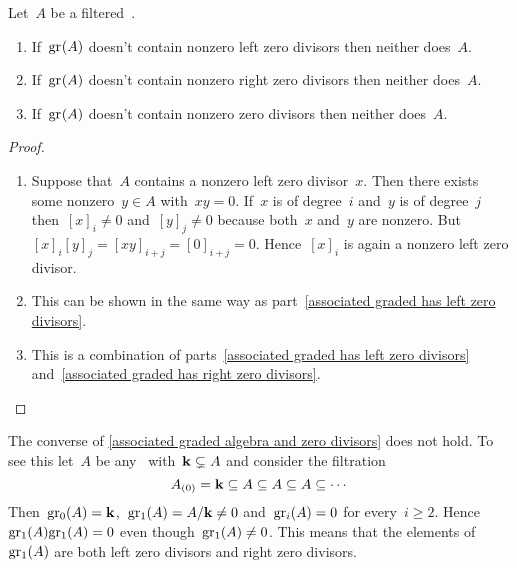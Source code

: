 \begin{proposition}
  \label{associated graded algebra and zero divisors}
  Let~$A$ be a filtered~{\algebra{$\kf$}}.
  \begin{enumerate}
    \item
      \label{associated graded has left zero divisors}
      If~$\gr(A)$ doesn’t contain nonzero left zero divisors then neither does~$A$.
    \item
      \label{associated graded has right zero divisors}
      If~$\gr(A)$ doesn’t contain nonzero right zero divisors then neither does~$A$.
    \item
      If~$\gr(A)$ doesn’t contain nonzero zero divisors then neither does~$A$.
  \end{enumerate}
\end{proposition}


\begin{proof}
  \leavevmode
  \begin{enumerate}
    \item
      Suppose that~$A$ contains a nonzero left zero divisor~$x$.
      Then there exists some nonzero~$y \in A$ with~$xy = 0$.
      If~$x$ is of degree~$i$ and~$y$ is of degree~$j$ then~$[x]_i \neq 0$ and~$[y]_j \neq 0$ because both~$x$ and~$y$ are nonzero.
      But~$[x]_i [y]_j = [xy]_{i+j} = [0]_{i+j} = 0$.
      Hence~$[x]_i$ is again a nonzero left zero divisor.
    \item
      This can be shown in the same way as part~\ref*{associated graded has left zero divisors}.
    \item
      This is a combination of parts~\ref*{associated graded has left zero divisors} and~\ref*{associated graded has right zero divisors}.
    \qedhere
  \end{enumerate}
\end{proof}


\begin{remark}
  The converse of \cref{associated graded algebra and zero divisors} does not hold.
  To see this let~$A$ be any~\algebra{$\kf$} with~$\mathbf{k} \subsetneq A$ and consider the filtration
  \[
    A_{(0)}
    =
    \mathbf{k}
    \subseteq
    A
    \subseteq
    A
    \subseteq
    A
    \subseteq
    \dotsb
  \]
  Then~$\gr[0](A) = \kf$,~$\gr[1](A) = A/{\kf} \neq 0$ and~$\gr[i](A) = 0$ for every~$i \geq 2$.
  Hence~$\gr[1](A) \gr[1](A) = 0$ even though~$\gr[1](A) \neq 0$.
  This means that the elements of~$\gr[1](A)$ are both left zero divisors and right zero divisors.
\end{remark}




